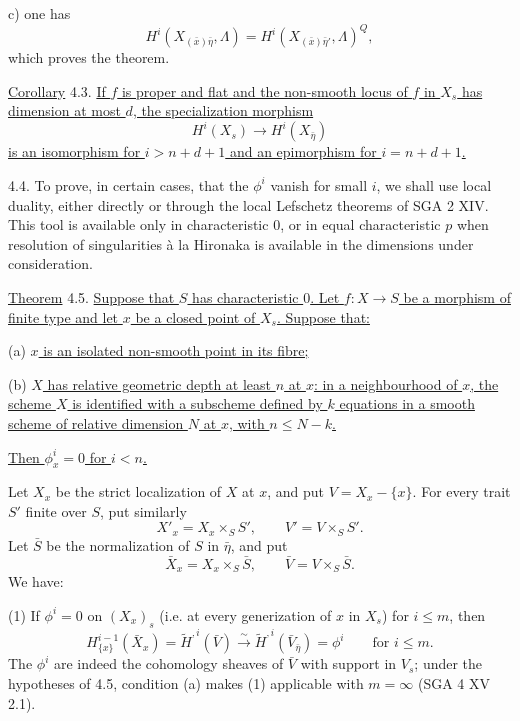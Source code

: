 c) one has
\[
H^i(X_{(\bar x)\bar\eta},\Lambda)
=H^i(X_{(\bar x)\bar\eta'},\Lambda)^Q,
\]
which proves the theorem.

\underline{Corollary} 4.3. \underline{If $f$ is proper and flat and the
non-smooth locus of $f$ in $X_s$ has dimension at most $d$, the
specialization morphism}
\[
H^i(X_s)\longrightarrow H^i(X_{\bar\eta})
\]
\underline{is an isomorphism for $i>n+d+1$ and an epimorphism for
$i=n+d+1$.}

4.4. To prove, in certain cases, that the $\phi^i$ vanish for small
$i$, we shall use local duality, either directly or through the local
Lefschetz theorems of SGA 2 XIV. This tool is available only in
characteristic $0$, or in equal characteristic $p$ when resolution of
singularities \`a la Hironaka is available in the dimensions under
consideration.


\underline{Theorem} 4.5. \underline{Suppose that $S$ has characteristic
$0$. Let $f:X\longrightarrow S$ be a morphism of finite type and let
$x$ be a closed point of $X_s$. Suppose that:}

(a) \underline{$x$ is an isolated non-smooth point in its fibre;}

(b) \underline{$X$ has relative geometric depth at least $n$ at $x$:
in a neighbourhood of $x$, the scheme $X$ is identified with a
subscheme defined by $k$ equations in a smooth scheme of relative
dimension $N$ at $x$, with $n\leqslant N-k$.}

\underline{Then $\phi^i_x=0$ for $i<n$.}

Let $X_x$ be the strict localization of $X$ at $x$, and put
$V=X_x-\{x\}$. For every trait $S'$ finite over $S$, put similarly
\[
X'_x=X_x\times_S S',\qquad V'=V\times_S S'.
\]
Let $\bar S$ be the normalization of $S$ in $\bar\eta$, and put
\[
\bar X_x=X_x\times_S\bar S,
\qquad \bar V=V\times_S\bar S.
\]
We have:

(1) If $\phi^i=0$ on $(X_x)_s$ (i.e. at every generization of $x$ in
$X_s$) for $i\leqslant m$, then
\begin{equation*}
H^{i-1}_{\{x\}}(\bar X_x)
=\widetilde H^{,i}(\bar V)
\xrightarrow{\ \sim\ }
\widetilde H^{,i}(\bar V_{\bar\eta})
=\phi^i
\qquad\text{for }i\leqslant m.
\end{equation*}
The $\phi^i$ are indeed the cohomology sheaves of $\bar V$ with support
in $V_s$; under the hypotheses of 4.5, condition (a) makes (1)
applicable with $m=\infty$ (SGA 4 XV 2.1).

